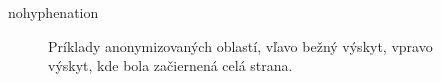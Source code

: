 \begin{hyphenrules}{nohyphenation}
\begin{figure}[H]
\begin{minipage}[t]{.3\linewidth}
\caption{Príklady anonymizovaných oblastí, vľavo bežný výskyt, vpravo výskyt, kde bola začiernená celá strana.}
\label{fig:3.3} 
\end{minipage}\hfill
\begin{minipage}[b]{.3\linewidth}

\end{minipage}
\end{figure}
\end{hyphenrules}
